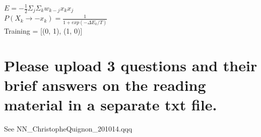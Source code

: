 \documentclass{scrartcl}
\begin{document}
$E = -\frac{1}{2}\Sigma_{j}\Sigma_{k}w_{k-j}x_{k}x_{j}$\\
$P(X_{k} \to -x_{k}) = \frac{1}{1+exp(-\Delta E_{k}/T)}$\\

Training = [(0, 1), (1, 0)]




\section{Please upload 3 questions and their brief answers on the reading material in a separate txt 
file.}
See NN\_ChristopheQuignon\_201014.qqq
 







%



\end{document}
